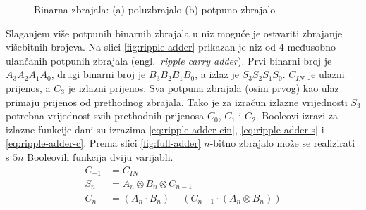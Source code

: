 \documentclass[times, utf8, diplomski]{fer}
\begin{document}
\begin{figure}[htb]
	\hspace{\fill}
	\caption{Binarna zbrajala: (a) poluzbrajalo (b) potpuno zbrajalo}
	\label{fig:adders}
\end{figure}

Slaganjem više potpunih binarnih zbrajala u niz moguće je ostvariti zbrajanje višebitnih brojeva. Na slici \ref{fig:ripple-adder} prikazan je niz od $4$ međusobno ulančanih potpunih zbrajala (engl.~\textit{ripple carry adder}). Prvi binarni broj je $A_{3}A_{2}A_{1}A_{0}$, drugi binarni broj je $B_{3}B_{2}B_{1}B_{0}$, a izlaz je $S_{3}S_{2}S_{1}S_{0}$. $C_{IN}$ je ulazni prijenos, a $C_{3}$ je izlazni prijenos. Sva potpuna zbrajala (osim prvog) kao ulaz primaju prijenos od prethodnog zbrajala. Tako je za izračun izlazne vrijednosti $S_{3}$ potrebna vrijednost svih prethodnih prijenosa $C_{0}$, $C_{1}$ i $C_{2}$. Booleovi izrazi za izlazne funkcije dani su izrazima \ref{eq:ripple-adder-cin}, \ref{eq:ripple-adder-s} i \ref{eq:ripple-adder-c}. Prema slici \ref{fig:full-adder} $n$-bitno zbrajalo može se realizirati s $5n$ Booleovih funkcija dviju varijabli.
%
\begin{align}
	\label{eq:ripple-adder-cin}
	C_{-1} &= C_{IN} \\
	\label{eq:ripple-adder-s}
	S_{n} &= A_{n} \otimes B_{n} \otimes C_{n-1} \\
	\label{eq:ripple-adder-c}
	C_{n} &= (A_{n} \cdot B_{n}) + (C_{n-1} \cdot (A_{n} \otimes B_{n}))
\end{align}
\end{document}
